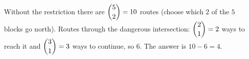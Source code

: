 Without the restriction there are $\dbinom52=10$ routes (choose which $2$ of the $5$ blocks go north). Routes through the dangerous intersection: $\dbinom21=2$ ways to reach it and $\dbinom31=3$ ways to continue, so $6$. The answer is $10-6=\boxed{4}$.
